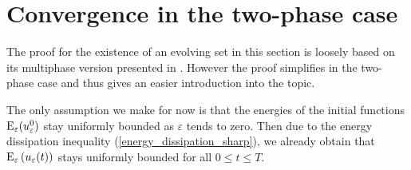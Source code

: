 \section{Convergence in the two-phase case}

The proof for the existence of an evolving set in this section is loosely based 
on its multiphase version presented 
in \cite{convergence_of_allen_cahn_equation_to_multiphase_mean_curvature_flow}. 
However the proof simplifies in the two-phase case and thus gives an easier 
introduction into the topic.

The only assumption we make for now is that the energies of the initial 
functions $ \operatorname{E}_{ \varepsilon } ( u_{ \varepsilon }^{ 0 } ) $ stay 
uniformly bounded as $ \varepsilon $ tends to zero. 
Then due to the energy dissipation inequality (\ref{energy_dissipation_sharp}), 
we already obtain that $ \operatorname{E}_{ \varepsilon } \left( u_{\varepsilon } ( t ) 
\right) $ stays uniformly bounded for all
$ 0 \leq t \leq T $.

